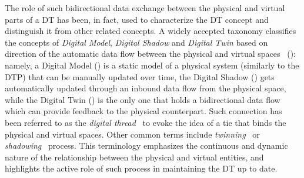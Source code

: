 The role of such bidirectional data exchange between the physical and virtual parts
of a \ac{DT} has been, in fact, used to characterize the \ac{DT} concept and distinguish it from other related concepts.
%
A widely accepted taxonomy classifies the concepts of \emph{Digital Model}, \emph{Digital Shadow} and \emph{Digital Twin} based on direction of the automatic data flow between the physical and virtual spaces~\cite{kritzinger2018dtmanufacturing} ():
namely, 
a Digital Model () is a static model of a physical system (similarly to the DTP) that can be manually updated over time,
the Digital Shadow () gets automatically updated through an inbound data flow from the physical space,
while the Digital Twin () is the only one that holds a bidirectional data flow which can provide feedback to the physical counterpart.
%
Such connection has been referred to as the \emph{digital thread}~\cite{Singh_Willcox_2018,Grieves_2023} to evoke the idea of a tie that binds the physical and virtual spaces.
%
Other common terms include \emph{twinning}~\cite{JONES202036} or \emph{shadowing}~\cite{Jiang_Yin_Li_Luo_Kaynak_2021,web-of-dt-ricci-2022} process. 
%
This terminology emphasizes the continuous and dynamic nature of the relationship between the physical and virtual entities, 
and highlights the active role of such process in maintaining the \ac{DT} up to date.

